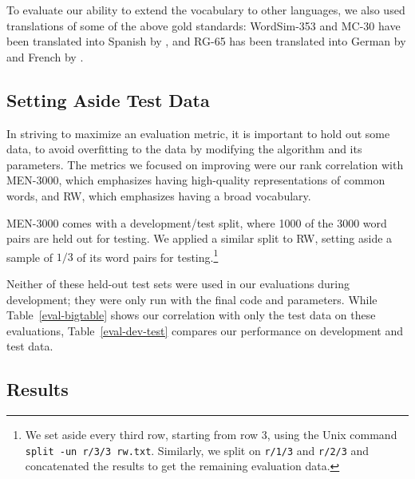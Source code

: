 \documentclass[11pt,letterpaper]{article}
\begin{document}
To evaluate our ability to extend the vocabulary to other languages, we also
used translations of some of the above gold standards: WordSim-353 and MC-30
have been translated into Spanish by , and
RG-65 has been translated into German by  and
French by .

\subsection{Setting Aside Test Data}

In striving to maximize an evaluation metric, it is important to hold out some
data, to avoid overfitting to the data by modifying the algorithm and its
parameters. The metrics we focused on improving were our rank correlation with
MEN-3000, which emphasizes having high-quality representations of common words,
and RW, which emphasizes having a broad vocabulary.

MEN-3000 comes with a development/test split, where 1000 of the 3000 word pairs
are held out for testing. We applied a similar split to RW, setting aside a
sample of $1/3$ of its word pairs for testing.\footnote{
    We set aside every third row, starting from row 3, using the Unix command
    {\tt split -un r/3/3 rw.txt}. Similarly, we split on {\tt r/1/3} and
    {\tt r/2/3} and concatenated the results to get the remaining evaluation
    data.
}

Neither of these held-out test sets were used in our evaluations during
development; they were only run with the final code and parameters. While
Table~\ref{eval-bigtable} shows our correlation with only the test data on
these evaluations, Table~\ref{eval-dev-test} compares our performance on
development and test data.

\subsection{Results}
\end{document}
